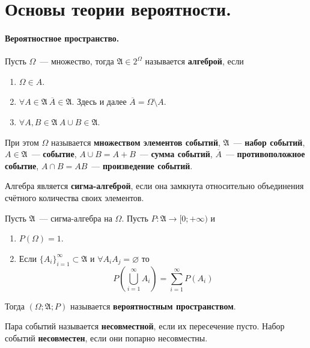\documentclass{article}
\newcommand{\A}{{\mathfrak A}}
\begin{document}
    \tableofcontents
    \section{Основы теории вероятности.}
    \paragraph{Вероятностное пространство.}
    \begin{definition}
        Пусть $\Omega$~--- множество, тогда $\A\in 2^\Omega$ называется \textbf{алгеброй}, если
        \begin{enumerate}
            \item $\Omega\in A$.
            \item $\forall A\in\mathfrak A~\overline A\in\A$. Здесь и далее $\overline A=\Omega\setminus A$.
            \item $\forall A,B\in\A~A\cup B\in\A$.
        \end{enumerate}
        При этом $\Omega$ называется \textbf{множеством элементов событий}, $\A$~--- \textbf{набор событий}, $A\in\A$~--- \textbf{событие}, $A\cup B=A+B$~--- \textbf{сумма событий}, $\overline A$~--- \textbf{противоположное событие}, $A\cap B=AB$~--- \textbf{произведение событий}.
    \end{definition}
    \begin{definition}
        Алгебра является \textbf{сигма-алгеброй}, если она замкнута относительно объединения счётного количества своих элементов.
    \end{definition}
    \begin{definition}
        Пусть $\A$~--- сигма-алгебра на $\Omega$. Пусть $P\colon \A\to[0;+\infty)$ и
        \begin{enumerate}
            \item $P(\Omega)=1$.
            \item Если $\{A_i\}_{i=1}^\infty\subset\A$ и $\forall A_iA_j=\varnothing$ то
            $$
            P\left(\bigcup\limits_{i=1}^\infty A_i\right)=\sum\limits_{i=1}^\infty P(A_i)
            $$
        \end{enumerate}
        Тогда $(\Omega;\A;P)$ называется \textbf{вероятностным пространством}.
    \end{definition}
    \begin{definition}
        Пара событий называется \textbf{несовместной}, если их пересечение пусто. Набор событий \textbf{несовместен}, если они попарно несовместны.
    \end{definition}
\end{document}
